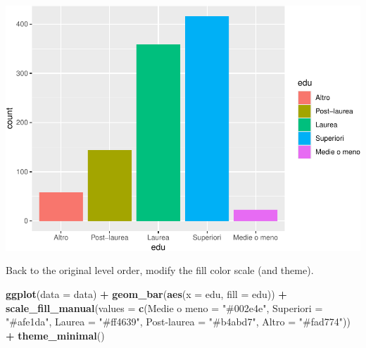 \documentclass[
]{book}
\newenvironment{Shaded}{\begin{snugshade}}{\end{snugshade}}
\newcommand{\AttributeTok}[1]{\textcolor[rgb]{0.13,0.29,0.53}{#1}}
\newcommand{\FunctionTok}[1]{\textcolor[rgb]{0.13,0.29,0.53}{\textbf{#1}}}
\newcommand{\NormalTok}[1]{#1}
\newcommand{\OtherTok}[1]{\textcolor[rgb]{0.56,0.35,0.01}{#1}}
\newcommand{\SpecialCharTok}[1]{\textcolor[rgb]{0.81,0.36,0.00}{\textbf{#1}}}
\newcommand{\StringTok}[1]{\textcolor[rgb]{0.31,0.60,0.02}{#1}}
\begin{document}
\includegraphics{R-for-social-research-and-business-analytics_files/figure-latex/unnamed-chunk-27-1.pdf}

Back to the original level order, modify the fill color scale (and theme).

\begin{Shaded}
\begin{Highlighting}[]
\FunctionTok{ggplot}\NormalTok{(}\AttributeTok{data =}\NormalTok{ data) }\SpecialCharTok{+}
  \FunctionTok{geom\_bar}\NormalTok{(}\FunctionTok{aes}\NormalTok{(}\AttributeTok{x =}\NormalTok{ edu, }\AttributeTok{fill =}\NormalTok{ edu)) }\SpecialCharTok{+}
  \FunctionTok{scale\_fill\_manual}\NormalTok{(}\AttributeTok{values =} \FunctionTok{c}\NormalTok{(}\StringTok{\textasciigrave{}}\AttributeTok{Medie o meno}\StringTok{\textasciigrave{}} \OtherTok{=} \StringTok{"\#002e4e"}\NormalTok{, }
                               \AttributeTok{Superiori =} \StringTok{"\#afe1da"}\NormalTok{, }
                               \AttributeTok{Laurea =} \StringTok{"\#ff4639"}\NormalTok{, }
                               \StringTok{\textasciigrave{}}\AttributeTok{Post{-}laurea}\StringTok{\textasciigrave{}} \OtherTok{=} \StringTok{"\#b4abd7"}\NormalTok{, }
                               \AttributeTok{Altro =} \StringTok{"\#fad774"}\NormalTok{)) }\SpecialCharTok{+}
  \FunctionTok{theme\_minimal}\NormalTok{()}
\end{Highlighting}
\end{Shaded}
\end{document}
